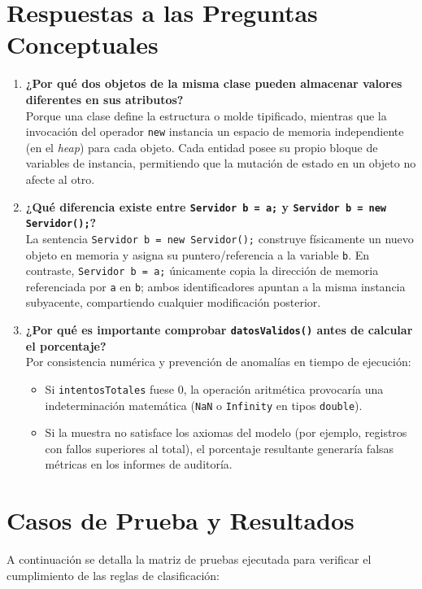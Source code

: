 \documentclass[11pt,a4paper]{article}
\begin{document}
\section{Respuestas a las Preguntas Conceptuales}
\begin{enumerate}
    \item \textbf{¿Por qué dos objetos de la misma clase pueden almacenar valores diferentes en sus atributos?} \\
    Porque una clase define la estructura o molde tipificado, mientras que la invocación del operador \texttt{new} instancia un espacio de memoria independiente (en el \textit{heap}) para cada objeto. Cada entidad posee su propio bloque de variables de instancia, permitiendo que la mutación de estado en un objeto no afecte al otro.

    \item \textbf{¿Qué diferencia existe entre \texttt{Servidor b = a;} y \texttt{Servidor b = new Servidor();}?}\\
    La sentencia \texttt{Servidor b = new Servidor();} construye físicamente un nuevo objeto en memoria y asigna su puntero/referencia a la variable \texttt{b}. En contraste, \texttt{Servidor b = a;} únicamente copia la dirección de memoria referenciada por \texttt{a} en \texttt{b}; ambos identificadores apuntan a la misma instancia subyacente, compartiendo cualquier modificación posterior.

    \item \textbf{¿Por qué es importante comprobar \texttt{datosValidos()} antes de calcular el porcentaje?} \\
    Por consistencia numérica y prevención de anomalías en tiempo de ejecución:
    \begin{itemize}
        \item Si \texttt{intentosTotales} fuese $0$, la operación aritmética provocaría una indeterminación matemática (\texttt{NaN} o \texttt{Infinity} en tipos \texttt{double}).
        \item Si la muestra no satisface los axiomas del modelo (por ejemplo, registros con fallos superiores al total), el porcentaje resultante generaría falsas métricas en los informes de auditoría.
    \end{itemize}
\end{enumerate}

\section{Casos de Prueba y Resultados}
A continuación se detalla la matriz de pruebas ejecutada para verificar el cumplimiento de las reglas de clasificación:
\end{document}
